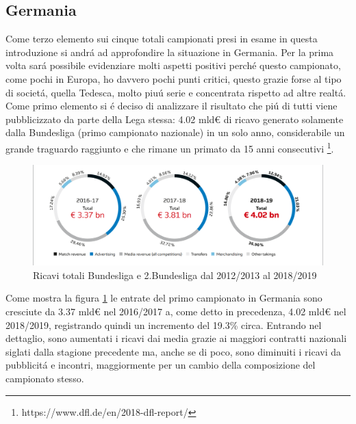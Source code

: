 \documentclass[
    corpo=11.5pt,
    oneside,
    evenboxes,
    tipotesi=triennale,
    stile=classica,
    oldstyle,
    autoretitolo,
    greek,
]{toptesi}
\begin{document}
\begin{interlinea}{1.5}
\subsection{Germania}
Come terzo elemento sui cinque totali campionati presi in esame in questa introduzione si andr\'a ad approfondire la situazione
in Germania. Per la prima volta sar\'a possibile evidenziare molti aspetti positivi perch\'e questo campionato, come pochi in Europa,
ho davvero pochi punti critici, questo grazie forse al tipo di societ\'a, quella Tedesca, molto piu\'u serie e concentrata rispetto
ad altre realt\'a.\\
Come primo elemento si \'e deciso di analizzare il risultato che pi\'u di tutti viene pubblicizzato da parte della Lega stessa: 
4.02 mld€ di ricavo generato solamente dalla Bundesliga (primo campionato nazionale) in un solo anno,
considerabile un grande traguardo raggiunto e che rimane un primato da 15 anni consecutivi
\footnote{https://www.dfl.de/en/2018-dfl-report/}.
\begin{figure}
    \centering
    \includegraphics[scale=.5]{img/bundes_entrate.png}
    \caption{Ricavi totali Bundesliga e 2.Bundesliga dal 2012/2013 al 2018/2019}
    \label{entrate_bundes}
\end{figure}
Come mostra la figura \ref{entrate_bundes} le entrate del primo campionato in Germania sono cresciute da 3.37 mld€ nel 2016/2017
a, come detto in precedenza, 4.02 mld€ nel 2018/2019, registrando quindi un incremento del 19.3\% circa. Entrando nel dettaglio, sono aumentati
i ricavi dai media grazie ai maggiori contratti nazionali siglati dalla stagione precedente ma, anche se di poco, sono diminuiti i ricavi 
da pubblicit\'a e incontri, maggiormente per un cambio della composizione del campionato stesso.
\begin{figure}
    \centering
     \quad

\end{figure}
\end{interlinea}
\end{document}
